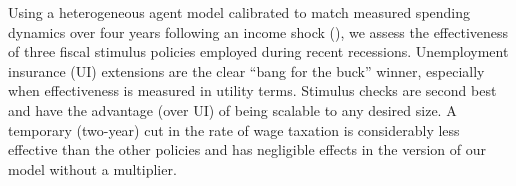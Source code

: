 \documentclass[../HAFiscal]{subfiles}
\begin{document}
Using a heterogeneous agent model calibrated to match measured spending dynamics over four years following an income shock (\cite{fagereng_mpc_2021}), we assess the effectiveness of three fiscal stimulus policies employed during recent recessions.  Unemployment insurance (UI) extensions are the clear ``bang for the buck'' winner, especially when effectiveness is measured in utility terms.  Stimulus checks are second best and have the advantage (over UI) of being scalable to any desired size.  A temporary (two-year) cut in the rate of wage taxation is considerably less effective than the other policies and has negligible effects in the version of our model without a multiplier.
\end{document}

